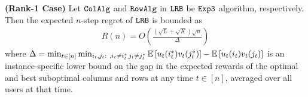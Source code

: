 
\begin{theorem} \textbf{(Rank-1 Case)}
\label{thm:upper bound} Let ${\tt ColAlg}$ and ${\tt RowAlg}$ in ${\tt LRB}$ be ${\tt Exp3}$ algorithm, respectively. Then the expected $n$-step regret of ${\tt LRB}$ is bounded as
\begin{align*}
  R(n) = O\left(\frac{\left(\sqrt{L } + \sqrt{K }\right)\sqrt{n}}{\Delta}\right)
\end{align*}
where $\Delta = \min_{t \in [n]} \min_{i_t,j_t:\ , i_t \neq i^*_t \, j_t \neq j^*_t} \mathbb{E}\left[u_t(i^*_t)v_t(j^*_t)\right] - \mathbb{E}\left[u_t(i_t)v_t(j_t)\right]$  is an instance-specific lower bound on the gap in the expected rewards of the optimal and best suboptimal columns and rows at any time $t \in [n]$, averaged over all users at that time.  


\end{theorem}
